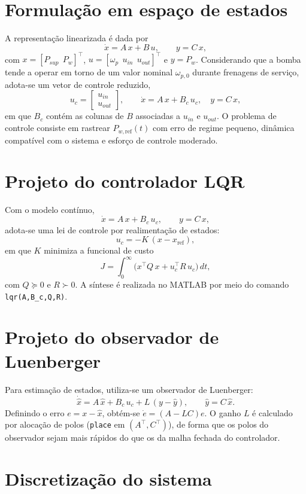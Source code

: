 \section{Formulação em espaço de estados}
\label{sec:controle-formulacao-espaço-estados}
A representação linearizada é dada por
\[
    \dot{x} = A\,x + B\,u, \qquad y = C\,x,
\]
com $x=[P_{sup}\ \ P_w]^\top$, $u=[\omega_p\ \ u_{in}\ \ u_{out}]^\top$ e $y=P_w$. Considerando que a bomba tende a operar em torno de um valor nominal $\omega_{p,0}$ durante frenagens de serviço, adota-se um vetor de controle reduzido,
\[
    u_c =
    \begin{bmatrix}
        u_{in} \\[2pt]
        u_{out}
    \end{bmatrix},
    \qquad
    \dot{x} = A\,x + B_c\,u_c, \quad y=C\,x,
\]
em que $B_c$ contém as colunas de $B$ associadas a $u_{in}$ e $u_{out}$. O problema de controle consiste em rastrear $P_{w,\text{ref}}(t)$ com erro de regime pequeno, dinâmica compatível com o sistema e esforço de controle moderado.
\section{Projeto do controlador LQR}
\label{sec:controle-lqr-luenberger}
Com o modelo contínuo,
\[
    \dot{x}=A\,x + B_c\,u_c,\qquad y=C\,x,
\]
adota-se uma lei de controle por realimentação de estados:
\[
    u_c = -K\,(x-x_{\text{ref}}),
\]
em que $K$ minimiza a funcional de custo
\[
    J=\int_0^\infty \big(x^\top Q\,x + u_c^\top R\,u_c\big)\,dt,
\]
com $Q\succeq 0$ e $R\succ 0$. A síntese é realizada no MATLAB por meio do comando \texttt{lqr(A,B\_c,Q,R)}.
\section{Projeto do observador de Luenberger}
\label{sec:projeto-observador-luenberger}
Para estimação de estados, utiliza-se um observador de Luenberger:
\[
    \dot{\hat{x}} = A\,\hat{x} + B_c\,u_c + L\,(y-\hat{y}),
    \qquad \hat{y}=C\,\hat{x}.
\]
Definindo o erro $e=x-\hat{x}$, obtém-se $\dot{e}=(A-LC)e$. O ganho $L$ é calculado por alocação de polos (\texttt{place} em $(A^\top,C^\top)$), de forma que os polos do observador sejam mais rápidos do que os da malha fechada do controlador.
\section{Discretização do sistema}
\label{sec:discretizacao-sistema}
